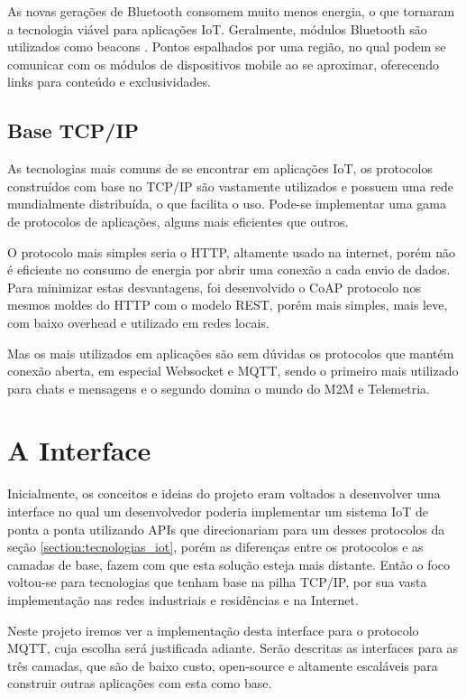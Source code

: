 As novas gerações de Bluetooth consomem muito menos energia, o que tornaram a tecnologia viável para aplicações IoT. Geralmente, módulos Bluetooth são utilizados como beacons \cite{Endeavor:Beacons}. Pontos espalhados por uma região, no qual podem se comunicar com os módulos de dispositivos mobile ao se aproximar, oferecendo links para conteúdo e exclusividades.

\subsection{Base TCP/IP}
\label{subsection:tcpip}

As tecnologias mais comuns de se encontrar em aplicações IoT, os protocolos construídos com base no TCP/IP são vastamente utilizados e possuem uma rede mundialmente distribuída, o que facilita o uso. Pode-se implementar uma gama de protocolos de aplicações, alguns mais eficientes que outros.

O protocolo mais simples seria o HTTP, altamente usado na internet, porém não é eficiente no consumo de energia por abrir uma conexão a cada envio de dados. Para minimizar estas desvantagens, foi desenvolvido o CoAP \cite{coap} protocolo nos mesmos moldes do HTTP com o modelo REST, porém mais simples, mais leve, com baixo overhead e utilizado em redes locais.

Mas os mais utilizados em aplicações são sem dúvidas os protocolos que mantém conexão aberta, em especial Websocket e MQTT, sendo o primeiro mais utilizado para chats e mensagens e o segundo domina o mundo do M2M e Telemetria.


\section{A Interface}
\label{section:interface}

Inicialmente, os conceitos e ideias do projeto eram voltados a desenvolver uma interface no qual um desenvolvedor poderia implementar um sistema IoT de ponta a ponta utilizando APIs que direcionariam para um desses protocolos da seção \ref{section:tecnologias_iot}, porém as diferenças entre os protocolos e as camadas de base, fazem com que esta solução esteja mais distante. Então o foco voltou-se  para tecnologias que tenham base na pilha TCP/IP, por sua vasta implementação nas redes industriais e residências e na Internet.

Neste projeto iremos ver a implementação desta interface para o protocolo MQTT, cuja escolha será justificada adiante. Serão descritas as interfaces para as três camadas, que são de baixo custo, open-source e altamente escaláveis para construir outras aplicações com esta como base.
 

